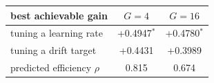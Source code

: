 \begin{tabular}{lcc}
\toprule
best achievable gain & $G = 4$ & $G = 16$ \\
\midrule
tuning a learning rate & +0.4947$^{\ast}$ & +0.4780$^{\ast}$ \\
tuning a drift target & +0.4431 & +0.3989 \\
predicted efficiency $\rho$ & 0.815 & 0.674 \\
\bottomrule
\end{tabular}